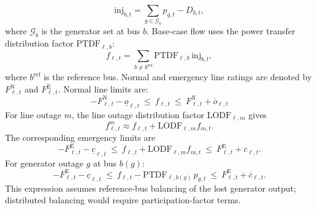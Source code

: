 \documentclass[runningheads]{llncs}
\begin{document}
\begin{equation}
\mathrm{inj}_{b,t}=\sum_{g\in\mathcal{G}_b} p_{g,t} - D_{b,t},
\end{equation}
where $\mathcal{G}_b$ is the generator set at bus $b$. Base-case flow uses the power transfer distribution factor $\mathrm{PTDF}_{\ell,b}$:
\begin{equation}
f_{\ell,t}=\sum_{b\neq b^{\mathrm{ref}}}\mathrm{PTDF}_{\ell,b}\,\mathrm{inj}_{b,t},
\label{eq:flow-def}
\end{equation}
where $b^{\mathrm{ref}}$ is the reference bus. Normal and emergency line ratings are denoted by $F^{\mathrm{N}}_{\ell,t}$ and $F^{\mathrm{E}}_{\ell,t}$. Normal line limits are:
\begin{equation}
-F^{\mathrm{N}}_{\ell,t}-\underline{o}_{\ell,t} \ \le\ f_{\ell,t}\ \le\ F^{\mathrm{N}}_{\ell,t}+\overline{o}_{\ell,t}
\label{eq:base-lims}
\end{equation}
For line outage $m$, the line outage distribution factor $\mathrm{LODF}_{\ell,m}$ gives
\begin{equation}
f_{\ell,t}^{m} \approx f_{\ell,t}+\mathrm{LODF}_{\ell,m}f_{m,t}. \label{eq:lodf}
\end{equation}
The corresponding emergency limits are
\begin{equation}
-F^{\mathrm{E}}_{\ell,t}-\underline{c}_{\ell,t}\ \le\ f_{\ell,t}+\mathrm{LODF}_{\ell,m}f_{m,t}\ \le\ F^{\mathrm{E}}_{\ell,t}+\overline{c}_{\ell,t}.
\label{eq:cont-line}
\end{equation}
For generator outage $g$ at bus $b(g)$:
\begin{equation}
-F^{\mathrm{E}}_{\ell,t}-\underline{c}_{\ell,t}\ \le\ f_{\ell,t}-\mathrm{PTDF}_{\ell,b(g)}\,p_{g,t}\ \le\ F^{\mathrm{E}}_{\ell,t}+\overline{c}_{\ell,t}.
\label{eq:cont-gen}
\end{equation}
This expression assumes reference-bus balancing of the lost generator output; distributed balancing would require participation-factor terms.
\end{document}
